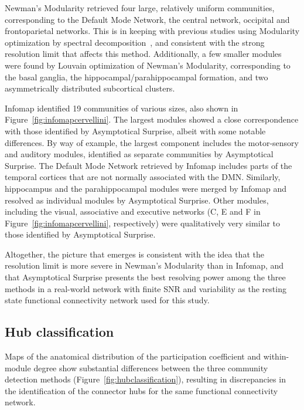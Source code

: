 Newman's Modularity retrieved four large, relatively uniform communities, corresponding to the Default Mode Network, the central network, occipital and frontoparietal networks.
This is in keeping with previous studies using Modularity optimization by spectral decomposition~\cite{crossley2013a}, and consistent with the strong resolution limit that affects this method.
Additionally, a few smaller modules were found by Louvain optimization of Newman's Modularity, corresponding to the basal ganglia, the hippocampal/parahippocampal formation, and two asymmetrically distributed subcortical clusters.

Infomap identified 19 communities of various sizes, also shown in Figure~\ref{fig:infomapcervellini}.
The largest modules showed a close correspondence with those identified by Asymptotical Surprise, albeit with some notable differences.
By way of example, the largest component includes the motor-sensory and auditory modules, identified as separate communities by Asymptotical Surprise.
The Default Mode Network retrieved by Infomap includes parts of the temporal cortices that are not normally associated with the DMN.
Similarly, hippocampus and the parahippocampal modules were merged by Infomap and resolved as individual modules by Asymptotical Surprise.
Other modules, including the visual, associative and executive networks (C, E and F in Figure~\ref{fig:infomapcervellini}, respectively) were qualitatively very similar to those identified by Asymptotical Surprise.

Altogether, the picture that emerges is consistent with the idea that the resolution limit is more severe in Newman's Modularity than in Infomap, and that Asymptotical Surprise presents the best resolving power among the three methods in a real-world network with finite SNR and variability as the resting state functional connectivity network used for this study.

\subsection{Hub classification}
Maps of the anatomical distribution of the participation coefficient and within-module degree show substantial differences between the three community detection methods (Figure~\ref{fig:hubclassification}), resulting in discrepancies in the identification of the connector hubs for the same functional connectivity network.

